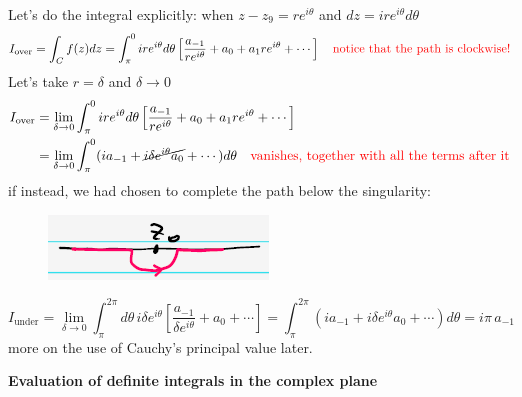 \documentclass{article}
\begin{document}
\noindent
Let’s do the integral explicitly: when $z-z_9 = re^{i\theta}$ and $dz = ire^{i\theta} d\theta$
\begin{equation}
    I_{\text{over}} = \int_C f(z) dz = \int_\pi^0 ire^{i\theta} d\theta \left[ \frac{a_{-1}}{re^{i\theta}} + a_0 + a_1 re^{i\theta} + \cdots \right] \quad \textcolor{red}{\text{notice that the path is clockwise!}}
\end{equation}
Let's take $r = \delta$ and $\delta \rightarrow 0$
\begin{align*}
    I_{\text{over}} &= \lim_{\delta \rightarrow 0} \int_\pi^0 ire^{i\theta} d\theta \left[ \frac{a_{-1}}{re^{i\theta}} + a_0 + a_1 re^{i\theta} + \cdots \right] \\ & = \lim_{\delta \rightarrow 0} \int_\pi^0 (ia_{-1} + \cancel{i\delta e^{i\theta}a_0 } + \cdots) d\theta \quad \textcolor{red}{\text{vanishes, together with all the terms after it}}
\end{align*}
if instead, we had chosen to complete the path below the singularity:
\begin{figure}[h]
    \centering
    \includegraphics[width=0.3\linewidth]{fig34.png}
\end{figure}
\begin{equation}
    I_{\text{under}} = \lim_{\delta \to 0} \int_{\pi}^{2\pi} d\theta\, i \delta e^{i\theta} 
\left[ \frac{a_{-1}}{\delta e^{i\theta}} + a_0 + \cdots \right] 
= \int_{\pi}^{2\pi} \left(i a_{-1} + i \delta e^{i\theta} a_0 + \cdots \right) d\theta 
= i \pi\, a_{-1}
\end{equation}
more on the use of Cauchy’s principal value later.

\vspace{2mm}\noindent
\textbf{Evaluation of definite integrals in the complex plane}
\end{document}
